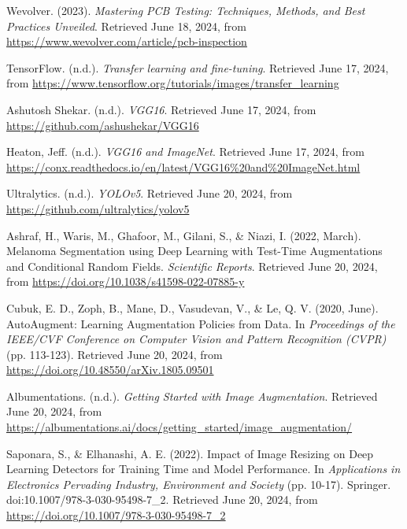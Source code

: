 \documentclass[12pt]{article}
\begin{document}
\clearpage
\newpage
{}
\begin{thebibliography}{10} 
    Wevolver. (2023). \textit{Mastering PCB Testing: Techniques, Methods, and Best Practices Unveiled}. Retrieved June 18, 2024, from \url{https://www.wevolver.com/article/pcb-inspection}

    TensorFlow. (n.d.). \textit{Transfer learning and fine-tuning}. Retrieved June 17, 2024, from \url{https://www.tensorflow.org/tutorials/images/transfer_learning}

    Ashutosh Shekar. (n.d.). \textit{VGG16}. Retrieved June 17, 2024, from \url{https://github.com/ashushekar/VGG16}

    Heaton, Jeff. (n.d.). \textit{VGG16 and ImageNet}. Retrieved June 17, 2024, from \url{https://conx.readthedocs.io/en/latest/VGG16%20and%20ImageNet.html}

    Ultralytics. (n.d.). \textit{YOLOv5}. Retrieved June 20, 2024, from \url{https://github.com/ultralytics/yolov5}

    Ashraf, H., Waris, M., Ghafoor, M., Gilani, S., \& Niazi, I. (2022, March). Melanoma Segmentation using Deep Learning with Test-Time Augmentations and Conditional Random Fields. \textit{Scientific Reports}. Retrieved June 20, 2024, from \url{https://doi.org/10.1038/s41598-022-07885-y}

    Cubuk, E. D., Zoph, B., Mane, D., Vasudevan, V., \& Le, Q. V. (2020, June). AutoAugment: Learning Augmentation Policies from Data. In \textit{Proceedings of the IEEE/CVF Conference on Computer Vision and Pattern Recognition (CVPR)} (pp. 113-123). Retrieved June 20, 2024, from \url{https://doi.org/10.48550/arXiv.1805.09501}

    Albumentations. (n.d.). \textit{Getting Started with Image Augmentation}. Retrieved June 20, 2024, from \url{https://albumentations.ai/docs/getting_started/image_augmentation/}

    Saponara, S., \& Elhanashi, A. E. (2022). Impact of Image Resizing on Deep Learning Detectors for Training Time and Model Performance. In \textit{Applications in Electronics Pervading Industry, Environment and Society} (pp. 10-17). Springer. doi:10.1007/978-3-030-95498-7\_2. Retrieved June 20, 2024, from \url{https://doi.org/10.1007/978-3-030-95498-7_2}


\end{thebibliography}
\end{document}
